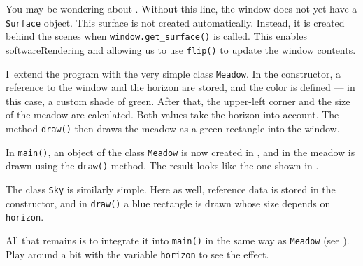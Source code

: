 You may be wondering about . Without this line, the window does not yet have a \texttt{Surface} object. This surface is not created automatically. Instead, it is created behind the scenes when \texttt{window.get\_surface()} is called. This enables \gls{softwareRendering} and allowing us to use \texttt{flip()} to update the window contents.


I~extend the program with the very simple class \texttt{Meadow}. In the constructor, a reference to the window and the horizon are stored, and the color is defined — in this case, a custom shade of green. After that, the upper-left corner and the size of the meadow are calculated. Both values take the horizon into account. The method \texttt{draw()} then draws the meadow as a green rectangle into the window.


In \texttt{main()}, an object of the class \texttt{Meadow} is now created in , and in  the meadow is drawn using the \texttt{draw()} method. The result looks like the one shown in .



The class \texttt{Sky} is similarly simple. Here as well, reference data is stored in the constructor, and in \texttt{draw()} a blue rectangle is drawn whose size depends on \texttt{horizon}.



All that remains is to integrate it into \texttt{main()} in the same way as \texttt{Meadow} (see ). Play around a bit with the variable \texttt{horizon} to see the effect.


